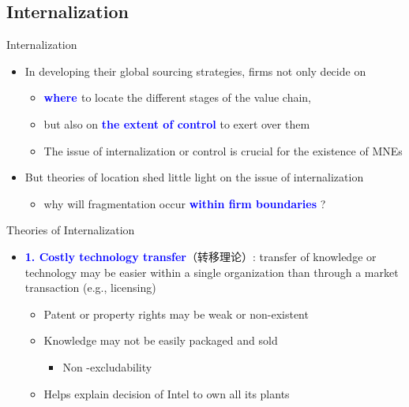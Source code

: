 \documentclass[10pt,hyperref={CJKbookmarks=true},xcolor=dvipsnames,aspectratio=169]{beamer}
\begin{document}
\subsection{Internalization}
\begin{frame}{Internalization}

\begin{itemize}
\item In developing their global sourcing strategies, firms not only decide
on 

\begin{itemize}
\item \textbf{\textcolor{blue}{where }}to locate the different stages of
the value chain, 
\item but also on \textbf{\textcolor{blue}{the extent of control}} to exert
over them 
\item The issue of internalization or control is crucial for the existence
of MNEs 
\end{itemize}
\item But theories of location shed little light on the issue of internalization 

\begin{itemize}
\item why will fragmentation occur \textbf{\textcolor{blue}{within firm
boundaries}} ? 
\end{itemize}
\end{itemize}
\end{frame}

\begin{frame}{Theories of Internalization }

\begin{itemize}
\item \textbf{\textcolor{blue}{1. Costly technology transfer}}（转移理论）: transfer
of knowledge or technology may be easier within a single organization
than through a market transaction (e.g., licensing) 

\begin{itemize}
\item Patent or property rights may be weak or non-existent
\item Knowledge may not be easily packaged and sold 

\begin{itemize}
\item Non -excludability 
\end{itemize}
\item Helps explain decision of Intel to own all its plants 
\end{itemize}
\end{itemize}
\end{frame}
\end{document}
